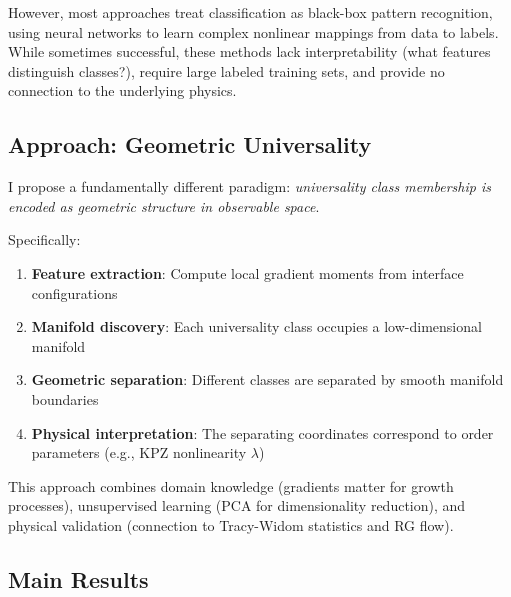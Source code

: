 \documentclass[aps,pre,twocolumn,superscriptaddress,showpacs]{revtex4-2}
\begin{document}
However, most approaches treat classification as black-box pattern recognition, using neural networks to learn complex nonlinear mappings from data to labels. While sometimes successful, these methods lack interpretability (what features distinguish classes?), require large labeled training sets, and provide no connection to the underlying physics.

\subsection{Approach: Geometric Universality}

I propose a fundamentally different paradigm: \emph{universality class membership is encoded as geometric structure in observable space}.

Specifically:
\begin{enumerate}
\item \textbf{Feature extraction}: Compute local gradient moments from interface configurations
\item \textbf{Manifold discovery}: Each universality class occupies a low-dimensional manifold
\item \textbf{Geometric separation}: Different classes are separated by smooth manifold boundaries
\item \textbf{Physical interpretation}: The separating coordinates correspond to order parameters (e.g., KPZ nonlinearity $\lambda$)
\end{enumerate}

This approach combines domain knowledge (gradients matter for growth processes), unsupervised learning (PCA for dimensionality reduction), and physical validation (connection to Tracy-Widom statistics and RG flow).

\subsection{Main Results}
\end{document}
